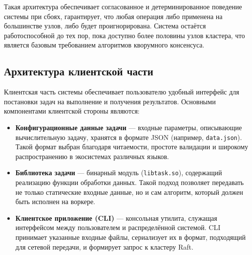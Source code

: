 Такая архитектура обеспечивает согласованное и детерминированное поведение
системы при сбоях, гарантирует, что любая операция либо применена на
большинстве узлов, либо будет проигнорирована. Система остаётся работоспособной
до тех пор, пока доступно более половины узлов кластера, что является базовым
требованием алгоритмов кворумного консенсуса.

\subsection{Архитектура клиентской части}

Клиентская часть системы обеспечивает пользователю удобный интерфейс
для постановки задач на выполнение и получения результатов.
Основными компонентами клиентской стороны являются:
\begin{itemize}
    \item \textbf{Конфигурационные данные задачи} — входные параметры,
    описывающие вычислительную задачу, хранятся в формате JSON
    (например, \texttt{data.json}). Такой формат выбран благодаря
    читаемости, простоте валидации и широкому распространению
    в экосистемах различных языков.
    \item \textbf{Библиотека задачи} — бинарный модуль
    (\texttt{libtask.so}), содержащий реализацию функции обработки данных.
    Такой подход позволяет передавать не только статические входные данные,
    но и сам алгоритм, который должен быть исполнен на воркере.
    \item \textbf{Клиентское приложение (CLI)} — консольная утилита,
    служащая интерфейсом между пользователем и распределённой системой.
    CLI принимает указанные входные файлы, сериализует их в формат,
    подходящий для сетевой передачи, и формирует запрос к кластеру Raft.
\end{itemize}

